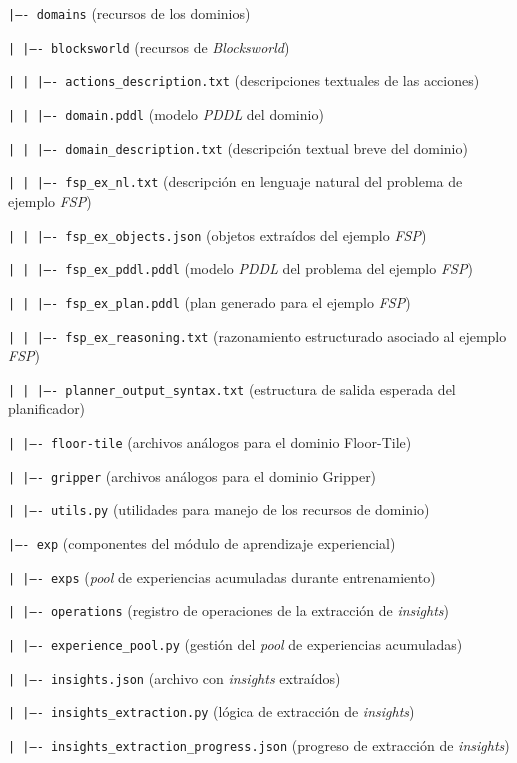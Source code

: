 \begin{anexes}
\texttt{|---- domains} (recursos de los dominios)

\texttt{|   |---- blocksworld} (recursos de \textit{Blocksworld})

\texttt{|   |   |---- actions\_description.txt} (descripciones textuales de las acciones)

\texttt{|   |   |---- domain.pddl} (modelo \textit{PDDL} del dominio)

\texttt{|   |   |---- domain\_description.txt} (descripción textual breve del dominio)

\texttt{|   |   |---- fsp\_ex\_nl.txt} (descripción en lenguaje natural del problema de ejemplo \textit{FSP})

\texttt{|   |   |---- fsp\_ex\_objects.json} (objetos extraídos del ejemplo \textit{FSP})

\texttt{|   |   |---- fsp\_ex\_pddl.pddl} (modelo \textit{PDDL} del problema del ejemplo \textit{FSP})

\texttt{|   |   |---- fsp\_ex\_plan.pddl} (plan generado para el ejemplo \textit{FSP})

\texttt{|   |   |---- fsp\_ex\_reasoning.txt} (razonamiento estructurado asociado al ejemplo \textit{FSP})

\texttt{|   |   |---- planner\_output\_syntax.txt} (estructura de salida esperada del planificador)

\texttt{|   |---- floor-tile} (archivos análogos para el dominio Floor-Tile)

\texttt{|   |---- gripper} (archivos análogos para el dominio Gripper)

\texttt{|   |---- utils.py} (utilidades para manejo de los recursos de dominio)

\texttt{|---- exp} (componentes del módulo de aprendizaje experiencial)

\texttt{|   |---- exps} (\textit{pool} de experiencias acumuladas durante entrenamiento)

\texttt{|   |---- operations} (registro de operaciones de la extracción de \textit{insights})

\texttt{|   |---- experience\_pool.py} (gestión del \textit{pool} de experiencias acumuladas)

\texttt{|   |---- insights.json} (archivo con \textit{insights} extraídos)

\texttt{|   |---- insights\_extraction.py} (lógica de extracción de \textit{insights})

\texttt{|   |---- insights\_extraction\_progress.json} (progreso de extracción de \textit{insights})


\end{anexes}
